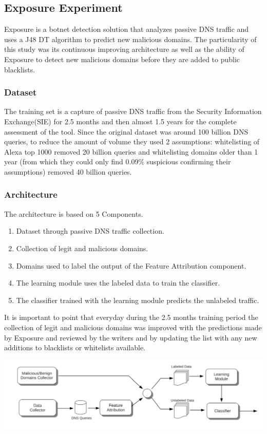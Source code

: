 \subsection{Exposure Experiment}
Exposure is a botnet detection solution that analyzes passive DNS traffic and uses a J48 DT algorithm to predict new malicious domains. The particularity of this study was its continuous improving architecture as well as the ability of Exposure to detect new malicious domains before they are added to public blacklists.
\subsubsection{Dataset}
The training set is a capture of passive DNS traffic from the Security Information Exchange(SIE) for 2.5 months and then almost 1.5 years for the complete assessment of the tool. Since the original dataset was around 100 billion DNS queries, to reduce the amount of volume they used 2 assumptions: whitelisting of Alexa top 1000  removed 20 billion queries and whitelisting domains older than 1 year (from which they could only find 0.09\% suspicious confirming their assumptions) removed 40 billion queries.
\subsubsection{Architecture}
The architecture is based on 5 Components. 
\begin{enumerate}
\item Dataset through passive DNS traffic collection.
\item Collection of legit and malicious domains.
\item Domains used to label the output of the Feature Attribution component.
\item The learning module uses the labeled data to train the classifier.
\item The classifier trained with the learning module predicts the unlabeled traffic.
\end{enumerate}
It is important to point that everyday during the 2.5 months training period the collection of legit and malicious domains was improved with the predictions made by Exposure and reviewed by the writers and by updating the list with any new additions to blacklists or whitelists available.

\includegraphics[scale=.8]{img/exposure_architecture.png}

